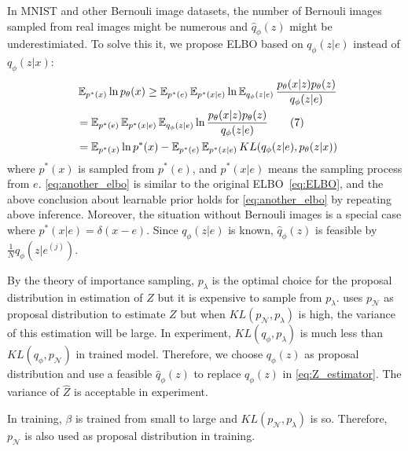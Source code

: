 In MNIST and other Bernouli image datasets, the number of Bernouli images sampled from real images might be numerous and $\hat{q}_\phi(z)$ might be underestimiated. To solve this it, we propose ELBO based on $q_\phi(z|e)$ instead of $q_\phi(z|x)$:
\begin{align*}~\label{eq:another_elbo}
	&\operatorname{\mathbb{E}}_{p^*(x)} \ln p_\theta(x) \geq \operatorname{\mathbb{E}}_{p^*(e)} \operatorname{\mathbb{E}}_{p^*(x|e)} \ln \operatorname{\mathbb{E}}_{q_\phi(z|e)} \frac{p_\theta(x|z)p_\theta(z)}{q_\phi(z|e)} \\
	 &= \operatorname{\mathbb{E}}_{p^*(e)} \operatorname{\mathbb{E}}_{p^*(x|e)} \operatorname{\mathbb{E}}_{q_\phi(z|e)} \ln \frac{p_\theta(x|z)p_\theta(z)}{q_\phi(z|e)} \tag{7} \\
	 &= \operatorname{\mathbb{E}}_{p^*(x)} \ln p^*(x) - \operatorname{\mathbb{E}}_{p^*(e)} \operatorname{\mathbb{E}}_{p^*(x|e)} KL(q_\phi(z|e), p_\theta(z|x))
\end{align*} 
where $p^*(x)$ is sampled from $p^*(e)$, and $p^*(x|e)$ means the sampling process from $e$. \cref{eq:another_elbo} is similar to the original ELBO~\cref{eq:ELBO}, and the above conclusion about learnable prior holds for \cref{eq:another_elbo} by repeating above inference. Moreover, the situation without Bernouli images is a special case where $p^*(x|e) = \delta(x - e)$. %
Since $q_\phi(z|e)$ is known, $\hat{q}_\phi(z)$ is feasible by $\frac{1}{N} q_\phi(z|e^{(j)})$. 

By the theory of importance sampling, $p_\lambda$ is the optimal choice for the proposal distribution in estimation of $Z$ but it is expensive to sample from $p_\lambda$. 
\cite{bauer2019resampled} uses $p_\mathcal{N}$ as proposal distribution to estimate $Z$ but when $KL(p_\mathcal{N}, p_\lambda)$ is high, the variance of this estimation will be large. In experiment, $KL(q_\phi, p_\lambda)$ is much less than $KL(q_\phi, p_\mathcal{N})$ in trained model. Therefore, we choose $q_\phi(z)$ as proposal distribution and use a feasible $\hat{q}_\phi(z)$ to replace $q_\phi(z)$ in \cref{eq:Z_estimator}. The variance of $\hat{Z}$ is acceptable in experiment.  

In training, $\beta$ is trained from small to large and $KL(p_\mathcal{N}, p_\lambda)$ is so. Therefore, $p_\mathcal{N}$ is also used as proposal distribution in training. 